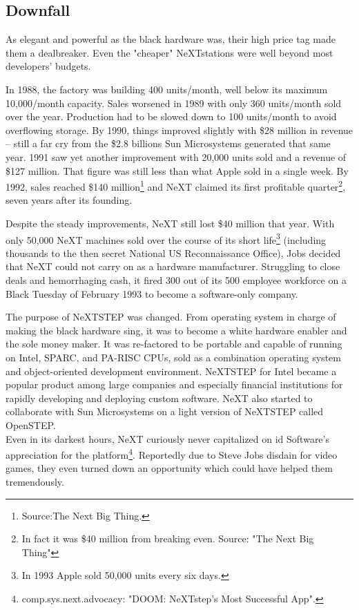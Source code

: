 \subsection{Downfall}
As elegant and powerful as the black hardware was, their high price tag made them a dealbreaker. Even the "cheaper" NeXTstations were well beyond most developers' budgets.\\
\par
 In 1988, the factory was building 400 units/month, well below its maximum 10,000/month capacity. Sales worsened in 1989 with only 360 units/month sold over the year. Production had to be slowed down to 100 units/month to avoid overflowing storage. By 1990, things improved slightly with \$28 million in revenue -- still a far cry from the \$2.8 billions Sun Microsystems generated that same year. 1991 saw yet another improvement with 20,000 units sold and a revenue of \$127 million. That figure was still less than what Apple sold in a single week. By 1992, sales reached \$140 million\footnote{Source:The Next Big Thing.} and NeXT claimed its first profitable quarter\footnote{In fact it was \$40 million from breaking even. Source: "The Next Big Thing"}, seven years after its founding.\\
\par
Despite the steady improvements, NeXT still lost \$40 million that year. With only 50,000 NeXT machines sold over the course of its short life\footnote{In 1993 Apple sold 50,000 units every six days.} (including thousands to the then secret National US Reconnaissance Office), Jobs decided that NeXT could not carry on as a hardware manufacturer. Struggling to close deals and hemorrhaging cash, it fired 300 out of its 500 employee workforce on a Black Tuesday of February 1993 to become a software-only company.\\
\par
 The purpose of NeXTSTEP was changed. From operating system in charge of making the black hardware sing, it was to become a white hardware enabler and the sole money maker. It was re-factored to be portable and capable of running on Intel, SPARC, and PA-RISC CPUs, sold as a combination operating system and object-oriented development environment. NeXTSTEP for Intel became a popular product among large companies and especially financial institutions for rapidly developing and deploying custom software. NeXT also started to collaborate with Sun Microsystems on a light version of NeXTSTEP called OpenSTEP.\\
Even in its darkest hours, NeXT curiously never capitalized on id Software's appreciation for the platform\footnote{comp.sys.next.advocacy: "DOOM: NeXTstep's Most Successful App".}. Reportedly due to Steve Jobs disdain for video games, they even turned down an opportunity which could have helped them tremendously.\\
\par

